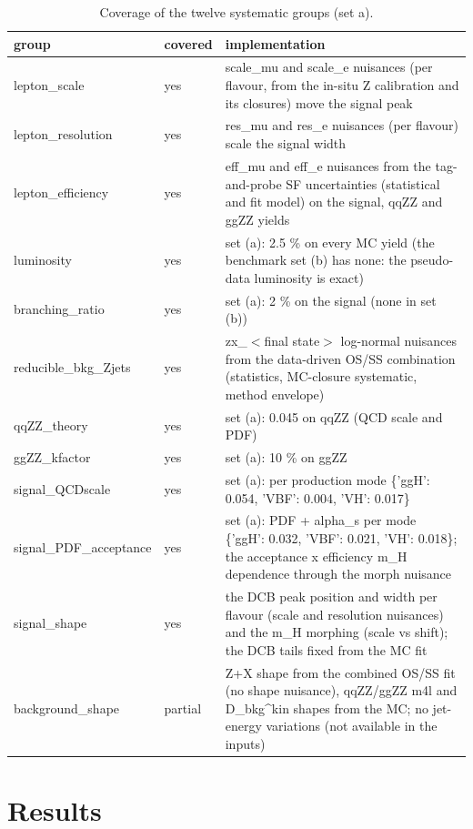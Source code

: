 \documentclass[11pt,a4paper]{article}
\begin{document}
\begin{table}[H]\centering\small\caption{Coverage of the twelve systematic groups (set a).}\begin{tabular}{llp{9cm}}\toprule group & covered & implementation\\\midrule
lepton\_scale & yes & scale\_mu and scale\_e nuisances (per flavour, from the in-situ Z calibration and its closures) move the signal peak\\
lepton\_resolution & yes & res\_mu and res\_e nuisances (per flavour) scale the signal width\\
lepton\_efficiency & yes & eff\_mu and eff\_e nuisances from the tag-and-probe SF uncertainties (statistical and fit model) on the signal, qqZZ and ggZZ yields\\
luminosity & yes & set (a): 2.5 \% on every MC yield (the benchmark set (b) has none: the pseudo-data luminosity is exact)\\
branching\_ratio & yes & set (a): 2 \% on the signal (none in set (b))\\
reducible\_bkg\_Zjets & yes & zx\_$<$final state$>$ log-normal nuisances from the data-driven OS/SS combination (statistics, MC-closure systematic, method envelope)\\
qqZZ\_theory & yes & set (a): 0.045 on qqZZ (QCD scale and PDF)\\
ggZZ\_kfactor & yes & set (a): 10 \% on ggZZ\\
signal\_QCDscale & yes & set (a): per production mode \{'ggH': 0.054, 'VBF': 0.004, 'VH': 0.017\}\\
signal\_PDF\_acceptance & yes & set (a): PDF + alpha\_s per mode \{'ggH': 0.032, 'VBF': 0.021, 'VH': 0.018\}; the acceptance x efficiency m\_H dependence through the morph nuisance\\
signal\_shape & yes & the DCB peak position and width per flavour (scale and resolution nuisances) and the m\_H morphing (scale vs shift); the DCB tails fixed from the MC fit\\
background\_shape & partial & Z+X shape from the combined OS/SS fit (no shape nuisance), qqZZ/ggZZ m4l and D\_bkg\^{}kin shapes from the MC; no jet-energy variations (not available in the inputs)\\
\bottomrule\end{tabular}\end{table}
\section{Results}
\end{document}
